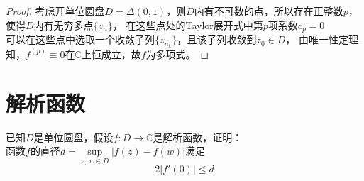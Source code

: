 \begin{proof}
    
    考虑开单位圆盘$D = \Delta(0,1)$，则$D$内有不可数的点，所以存在正整数$p$，使得$D$内有无穷多点$\{z_n\}$，
    在这些点处的\textup{Taylor}展开式中第$p$项系数$c_p=0$\\
    可以在这些点中选取一个收敛子列$\{z_{n_k}\}$，且该子列收敛到$z_0\in D$，
    由唯一性定理知，$f^{(p)}\equiv 0$在$\mathbb{C}$上恒成立，故$f$为多项式。

\end{proof}

\section{解析函数}

\iffalse
\begin{proposition}
    
    设$f$在一个包含单位圆盘的开集上（除去单位圆盘上的一个极点$z_0$）解析，证明：\\
    若$\lim\limits_{n=1}^{\infty}{a_nz^n}$表示$f$在开单位圆盘上的\textup{Taylor}级数，那么
    $$\lim_{n\to\infty}{\dfrac{a_n}{a_{n+1}}} = z_0$$

\end{proposition}

\begin{proof}
    
    考虑$f(z_0z)$的相同问题，则只需证明$z_0 = 1$的情况\\
    设$g(z)$是$f(z)$在$z=1$处\textup{Taylor}级数的主要部分，即
    $$g(z) = \sum_{p=1}^{k}{\dfrac{A_p}{(1-z)^p}},\quad p \geq 1$$
    因为$h(z) = \dfrac{1}{1-z} = \sum_{n=0}^{\infty}{z^n}$，则$h(z)$的$p-1$阶导数
    
    \begin{align*}
        (1-z)^{(p-1)} & = \dfrac{(p-1)!}{(1-z)^p}\\
        & = (\sum_{n=1}^{\infty}{z_n})^{(p-1)}\\
        & = \sum_{n=0}^{\infty}{(n+1)(n+2)\cdots(n+p+1)z^n}
    \end{align*}

    设$g(z) = \sum\limits_{n=1}^{\infty}{b_nz^n}$，有
    $$b_n = \sum_{p=1}^{k}{\dfrac{1}{(p-1)!}(n+1)(n+2)\cdots(n+p+1)}$$
    则$\lim\limits_{n\to\infty}{b_n} = $

\end{proof}

\fi

\begin{proposition}

    已知$D$是单位圆盘，假设$f:D\to\mathbb{C}$是解析函数，证明：\\
    函数$f$的直径$d =\sup\limits_{z,\ w\in D}{|f(z) - f(w)|}$满足
    $$2|f'(0)| \leq d$$

\end{proposition}


